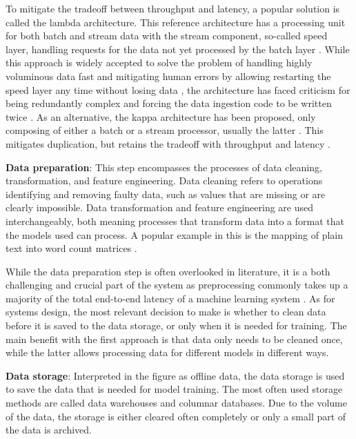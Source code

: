 To mitigate the tradeoff between throughput and latency, a popular solution is called the lambda architecture. This reference architecture has a processing unit for both batch and stream data with the stream component, so-called speed layer, handling requests for the data not yet processed by the batch layer \cite{beatingcap}. While this approach is widely accepted to solve the problem of handling highly voluminous data fast and mitigating human errors by allowing restarting the speed layer any time without losing data \cite{lambdakappa}, the architecture has faced criticism for being redundantly complex and forcing the data ingestion code to be written twice \cite{questioninglambda} \cite{uber} \cite{facebook}. As an alternative, the kappa architecture has been proposed, only composing of either a batch or a stream processor, usually the latter \cite{questioninglambda}. This mitigates duplication, but retains the tradeoff with throughput and latency \cite{lambdakappa}.

\textbf{Data preparation}: This step encompasses the processes of data cleaning, transformation, and feature engineering. Data cleaning refers to operations identifying and removing faulty data, such as values that are missing or are clearly impossible. Data transformation and feature engineering are used interchangeably, both meaning processes that transform data into a format that the models used can process. A popular example in this is the mapping of plain text into word count matrices \cite{dapbook}.

While the data preparation step is often overlooked in literature,
it is a both challenging and crucial part of the system as preprocessing commonly takes up a majority of the total end-to-end latency of a machine learning system \cite{adaptivelearningsystems}. As for systems design, the most relevant decision to make is whether to clean data before it is saved to the data storage, or only when it is  needed for training. The main benefit with the first approach is that data only needs to be cleaned once, while the latter allows processing data for different models in different ways.

\textbf{Data storage}: Interpreted in the figure as offline data, the data storage is used to save the data that is needed for model training. The most often used storage methods are called data warehouses and columnar databases. Due to the volume of the data, the storage is either cleared often completely or only a small part of the data is archived.

